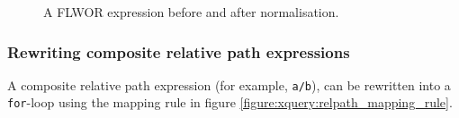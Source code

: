 \begin{figure}
\centering
{}
\caption{A FLWOR expression before and after normalisation.}
\end{figure}

\subsubsection{Rewriting composite relative path expressions}
A composite relative path expression (for example, \verb!a/b!), can be
rewritten into a \texttt{for}-loop using the mapping rule in figure
\ref{figure:xquery:relpath_mapping_rule}.

